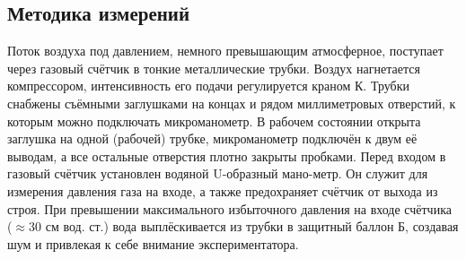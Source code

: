 	\subsection*{Методика измерений}\n
	\n
	Поток воздуха под давлением, немного превышающим атмосферное, поступает через газовый счётчик в тонкие металлические трубки. Воздух нагнетается компрессором, интенсивность его подачи регулируется краном К. Трубки снабжены съёмными заглушками на концах и рядом миллиметровых отверстий, к которым можно подключать микроманометр. В рабочем состоянии открыта заглушка на одной (рабочей) трубке, микроманометр подключён к двум её выводам, а все остальные отверстия плотно закрыты пробками.\n\n
Перед входом в газовый счётчик установлен водяной U-образный мано-метр. Он служит для измерения давления газа на входе, а также предохраняет счётчик от выхода из строя. При превышении максимального избыточного давления на входе счётчика ($\approx$30 см вод. ст.) вода выплёскивается из трубки в защитный баллон Б, создавая шум и привлекая к себе внимание экспериментатора.
